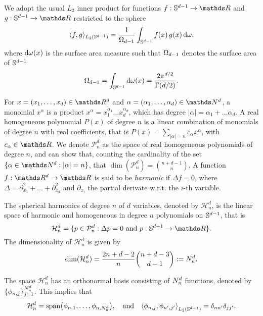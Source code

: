 We adopt the usual $L_2$ inner product for functions $f: \dsphere \rightarrow \Reals$ and $g: \dsphere \rightarrow \Reals$ restricted to the sphere 
\begin{equation}
     \langle f, g\rangle_{L_{2}(\mathbb{S}^{d-1})} = \frac{1}{\Omega_{d-1}} \int_{\mathbb{S}^{d-1}} f(x)\,g(x) \, \mathrm{d}{\omega},
\end{equation}
where $\mathrm{d}{\omega(x)}$ is the surface area measure such that $\Omega_{d-1}$ denotes the surface area of $\mathbb{S}^{d-1}$ 
\begin{equation}
\label{eq:surface}
    \Omega_{d-1} = \int_{\mathbb{S}^{d-1}} \mathrm{d}{\omega(x)} = \frac{2 \pi ^ {d/2}}{\Gamma(d/2)}.
\end{equation}

For $x = (x_1, \ldots, x_d) \in \Reals^d$ and $\alpha = (\alpha_1, \ldots, \alpha_d) \in \Naturals^d$, a monomial $x^\alpha$ is a product $x^\alpha = x_1^{\alpha_1} \ldots x_d^{\alpha_d}$, which has degree $|\alpha| = \alpha_1 + \ldots \alpha_d$. A real homogeneous polynomial $P(x)$ of degree $n$ is a linear combination of monomials of degree $n$ with real coefficients, that is $P(x) = \sum_{|\alpha| = n} c_{\alpha} x^{\alpha}$, with $c_\alpha \in \Reals$. We denote $\mathcal{P}_n^d$ as the space of real homogeneous polynomials of degree $n$, and can show that, counting the cardinality of the set $\{\alpha \in \Naturals^d: |\alpha| = n\}$, that $\dim(\mathcal{P}_n^d) = \binom{n + d -1}{n}$. A function $f:\Reals^d \rightarrow \Reals$ is said to be \emph{harmonic} if $\Delta f = 0$, where $\Delta = \partial_{x_1}^2 + \ldots + \partial_{x_d}^2$ and $\partial_{x_i}$ the partial derivate w.r.t. the $i$-th variable.

\begin{definition}
    The spherical harmonics of degree $n$ of $d$ variables, denoted by $\mathcal{H}_{n}^d$, is the linear space of harmonic and homogeneous in degree $n$ polynomials on $\mathbb{S}^{d-1}$, that is 
    \begin{equation}
        \mathcal{H}_{n}^d = \{p \in \mathcal{P}_n^d: \Delta p = 0\ \text{and}\ p: \dsphere \rightarrow \Reals \}.
    \end{equation}
The dimensionality of $ \mathcal{H}_{n}^d$ is given by
\begin{equation}
\label{eq:numharmonics}
\textrm{dim}(\mathcal{H}_{n}^d) = \frac{2 n + d - 2}{n} \binom{n + d - 3}{d - 1} := N^d_n.
\end{equation}
\end{definition}

The space $\mathcal{H}_{n}^d$ has an orthonormal basis consisting of $N^d_n$ functions, denoted by $\{\phi_{n,j}\}_{j=1}^{N^d_n}$. This implies that
\begin{equation}
    \mathcal{H}_{n}^d  = \textrm{span}\left(\phi_{n,1}, \ldots, \phi_{n, \dnumharmonicsforlevel}\right),\quad\text{and}\quad\left\langle \phi_{n, j}, \phi_{n', j'}\right\rangle_{L_2(\dsphere)} = \delta_{n n'} \delta_{j j'}.
\end{equation}

